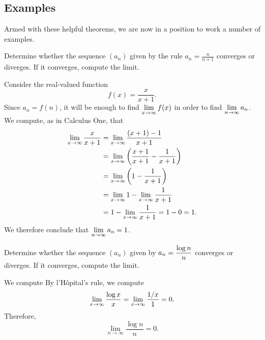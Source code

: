 \subsection{Examples}

Armed with these helpful theorems, we are now in a position to work a
number of examples.

\begin{example}
Determine whether the sequence $(a_n)$ given by the rule $a_n = \frac{n}{n+1}$ converges or
diverges. If it converges, compute the limit.
\end{example}

\begin{solution}
Consider the real-valued function
$$
f(x) = \frac{x}{x+1}.
$$
Since $a_n = f(n)$, it will be enough to find $\displaystyle\lim_{x \to \infty} f(x)$ in order to find $\displaystyle\lim_{n \to \infty} a_n$.
We compute, as in Calculus One, that
\begin{align*}
\lim_{x\to\infty}{x\over x+1}
&= \lim_{x\to\infty} \frac{(x+1) - 1}{x+1} \\
&= \lim_{x\to\infty} \left( \frac{x+1}{x+1} - \frac{1}{x+1} \right) \\
&= \lim_{x\to\infty} \left( 1 - \frac{1}{x+1} \right) \\
&= \lim_{x\to\infty} 1 - \lim_{x \to \infty} \frac{1}{x+1} \\
&= 1 - \lim_{x \to \infty} \frac{1}{x+1} = 1 - 0 = 1. \\
\end{align*}
We therefore conclude that $\displaystyle\lim_{n \to \infty} a_n = 1$.
\end{solution}

\begin{example}
\label{example:log-n-over-n}
Determine whether the sequence $(a_n)$ given by $\displaystyle a_n = \frac{\log n}{n}$ converges or
diverges.  If it converges, compute the limit.
\end{example}

\begin{solution}
We compute
By l'H\^opital's rule, we compute
$$\lim_{x\to\infty}{\log x\over x}=\lim_{x\to\infty}{1/x\over 1}=
0.$$
Therefore, $$\lim_{n \to \infty}  \frac{\log n}{n} = 0.$$
\end{solution}


